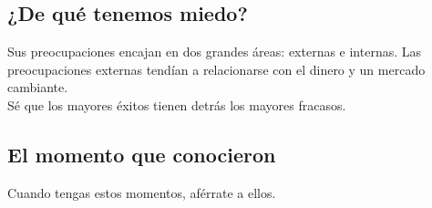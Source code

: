 \documentclass[10pt]{book}
\begin{document}
	    \subsection{¿De qué tenemos miedo?}
		Sus preocupaciones encajan en dos grandes áreas: externas e internas. Las preocupaciones externas tendían a relacionarse con el dinero y un mercado cambiante.\\ 
		Sé que los mayores éxitos tienen detrás los mayores fracasos. 
		
	    \subsection{El momento que conocieron}
		    Cuando tengas estos momentos, aférrate a ellos.	
\end{document}
